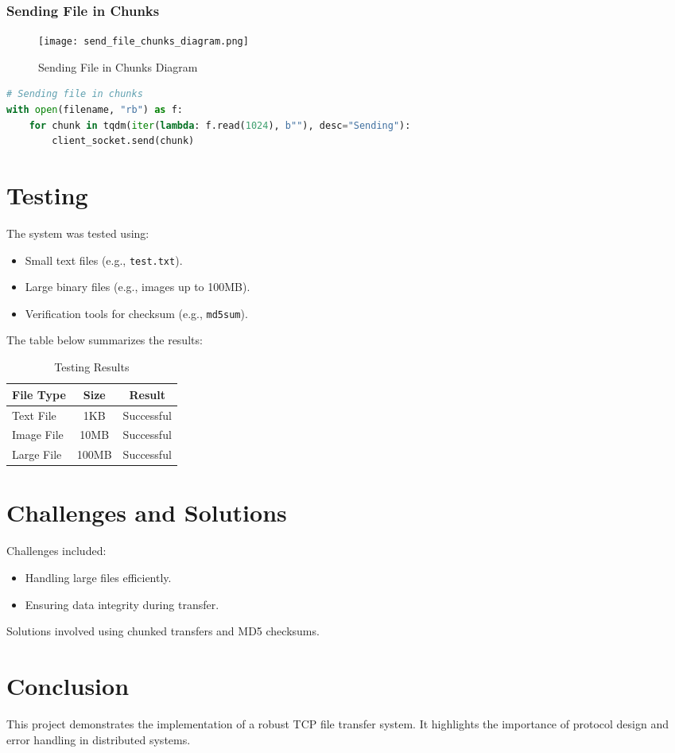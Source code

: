 \documentclass[a4paper,12pt]{article}
\begin{document}
\subsubsection{Sending File in Chunks}
\begin{figure}[H]
    \centering
    \texttt{[image: send\_file\_chunks\_diagram.png]}
    \caption{Sending File in Chunks Diagram}
\end{figure}
\begin{lstlisting}[language=Python]
# Sending file in chunks
with open(filename, "rb") as f:
    for chunk in tqdm(iter(lambda: f.read(1024), b""), desc="Sending"):
        client_socket.send(chunk)
\end{lstlisting}


\section{Testing}
The system was tested using:
\begin{itemize}
    \item Small text files (e.g., \texttt{test.txt}).
    \item Large binary files (e.g., images up to 100MB).
    \item Verification tools for checksum (e.g., \texttt{md5sum}).
\end{itemize}

The table below summarizes the results:

\begin{table}[h!]
\centering
\begin{tabular}{|l|c|c|}
\hline
\textbf{File Type} & \textbf{Size} & \textbf{Result} \\ \hline
Text File          & 1KB           & Successful       \\ \hline
Image File         & 10MB          & Successful       \\ \hline
Large File         & 100MB         & Successful       \\ \hline
\end{tabular}
\caption{Testing Results}
\end{table}

\section{Challenges and Solutions}
Challenges included:
\begin{itemize}
    \item Handling large files efficiently.
    \item Ensuring data integrity during transfer.
\end{itemize}
Solutions involved using chunked transfers and MD5 checksums.

\section{Conclusion}
This project demonstrates the implementation of a robust TCP file transfer system. 
It highlights the importance of protocol design and error handling in distributed systems.
\end{document}
